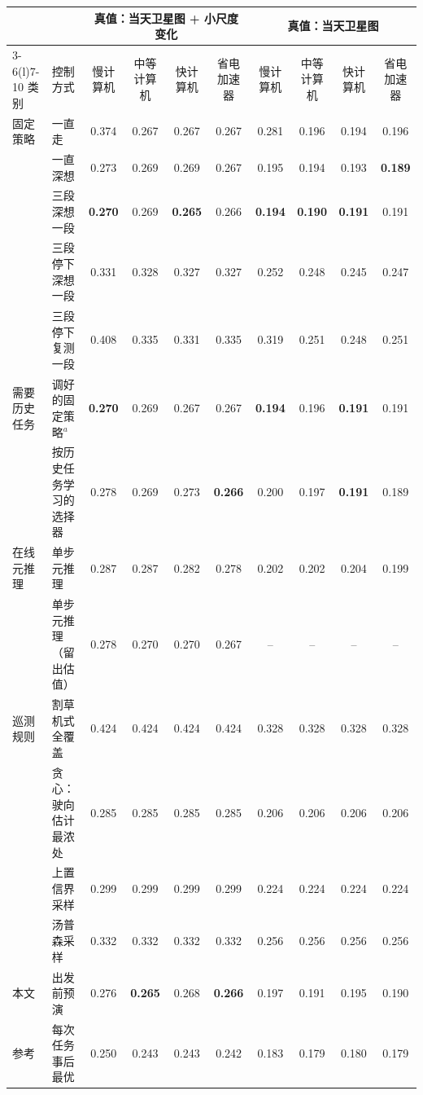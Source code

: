 \begin{tabular}{@{}llcccccccc@{}}
\toprule
 & & \multicolumn{4}{c}{真值：当天卫星图 + 小尺度变化} & \multicolumn{4}{c}{真值：当天卫星图} \\
\cmidrule(lr){3-6}\cmidrule(l){7-10}
类别 & 控制方式 & 慢计算机 & 中等计算机 & 快计算机 & 省电加速器 & 慢计算机 & 中等计算机 & 快计算机 & 省电加速器 \\
\midrule
固定策略 & 一直走 & 0.374 & 0.267 & 0.267 & 0.267 & 0.281 & 0.196 & 0.194 & 0.196 \\
 & 一直深想 & 0.273 & 0.269 & 0.269 & 0.267 & 0.195 & 0.194 & 0.193 & \textbf{0.189} \\
 & 三段深想一段 & \textbf{0.270} & 0.269 & \textbf{0.265} & 0.266 & \textbf{0.194} & \textbf{0.190} & \textbf{0.191} & 0.191 \\
 & 三段停下深想一段 & 0.331 & 0.328 & 0.327 & 0.327 & 0.252 & 0.248 & 0.245 & 0.247 \\
 & 三段停下复测一段 & 0.408 & 0.335 & 0.331 & 0.335 & 0.319 & 0.251 & 0.248 & 0.251 \\
\midrule
需要历史任务 & 调好的固定策略$^{a}$ & \textbf{0.270} & 0.269 & 0.267 & 0.267 & \textbf{0.194} & 0.196 & \textbf{0.191} & 0.191 \\
 & 按历史任务学习的选择器 & 0.278 & 0.269 & 0.273 & \textbf{0.266} & 0.200 & 0.197 & \textbf{0.191} & 0.189 \\
\midrule
在线元推理 & 单步元推理 & 0.287 & 0.287 & 0.282 & 0.278 & 0.202 & 0.202 & 0.204 & 0.199 \\
 & 单步元推理（留出估值） & 0.278 & 0.270 & 0.270 & 0.267 & -- & -- & -- & -- \\
\midrule
巡测规则 & 割草机式全覆盖 & 0.424 & 0.424 & 0.424 & 0.424 & 0.328 & 0.328 & 0.328 & 0.328 \\
 & 贪心：驶向估计最浓处 & 0.285 & 0.285 & 0.285 & 0.285 & 0.206 & 0.206 & 0.206 & 0.206 \\
 & 上置信界采样 & 0.299 & 0.299 & 0.299 & 0.299 & 0.224 & 0.224 & 0.224 & 0.224 \\
 & 汤普森采样 & 0.332 & 0.332 & 0.332 & 0.332 & 0.256 & 0.256 & 0.256 & 0.256 \\
\midrule
\rowcolor{violet!8}本文 & 出发前预演 & 0.276 & \textbf{0.265} & 0.268 & \textbf{0.266} & 0.197 & 0.191 & 0.195 & 0.190 \\
\midrule
参考 & 每次任务事后最优 & 0.250 & 0.243 & 0.243 & 0.242 & 0.183 & 0.179 & 0.180 & 0.179 \\
\bottomrule
\end{tabular}
